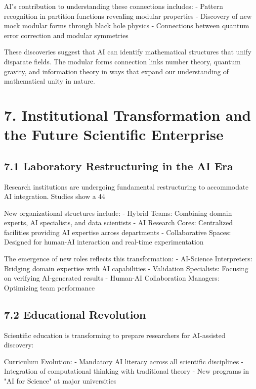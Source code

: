 \documentclass{article}
\begin{document}
AI's contribution to understanding these connections includes:
- Pattern recognition in partition functions revealing modular properties
- Discovery of new mock modular forms through black hole physics
- Connections between quantum error correction and modular symmetries


These discoveries suggest that AI can identify mathematical structures that unify disparate fields. The modular forms connection links number theory, quantum gravity, and information theory in ways that expand our understanding of mathematical unity in nature.


\section{7. Institutional Transformation and the Future Scientific Enterprise}

\subsection{7.1 Laboratory Restructuring in the AI Era}

Research institutions are undergoing fundamental restructuring to accommodate AI integration. Studies show a 44%


New organizational structures include:
- Hybrid Teams: Combining domain experts, AI specialists, and data scientists
- AI Research Cores: Centralized facilities providing AI expertise across departments
- Collaborative Spaces: Designed for human-AI interaction and real-time experimentation


The emergence of new roles reflects this transformation:
- AI-Science Interpreters: Bridging domain expertise with AI capabilities
- Validation Specialists: Focusing on verifying AI-generated results
- Human-AI Collaboration Managers: Optimizing team performance


\subsection{7.2 Educational Revolution}

Scientific education is transforming to prepare researchers for AI-assisted discovery:


Curriculum Evolution:
- Mandatory AI literacy across all scientific disciplines
- Integration of computational thinking with traditional theory
- New programs in "AI for Science" at major universities
\end{document}

